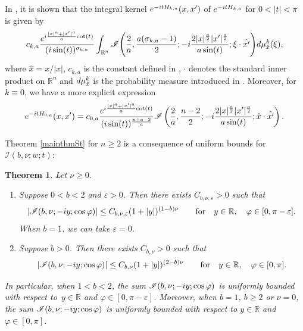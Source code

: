 \documentclass[10pt,a4paper]{article}
\numberwithin{equation}{section}
\newtheorem{Theorem}{Theorem}[section]
\def\R{\mathbb{R}}%
\def\e{\varepsilon}
\def\f{\varphi}
\def\m{\mu}
\def\n{\nu}
\def\x{\xi}
\newcommand{\sI}{\mathscr{I}}
\begin{document}
In \cite[Theorem C, equations (4.50) and (4.52)]{BKO}, it is shown that the integral kernel ${\rm e}^{-{\rm i}tH_{k,a}}(x,\allowbreak x')$ of ${\rm e}^{-{\rm i}tH_{k,a}}$ for $0<|t|<\pi$ is given by
\begin{align}\label{intkergen}
c_{k,a}\frac{{\rm e}^{{\rm i}\frac{|x|^a+|x'|^a}{a}\mathrm{cot}(t)} }{({\rm i}\sin (t))^{\sigma_{k,a}}} \int_{\R^n}\sI\Bigg(\frac{2}{a},\frac{a(\sigma_{k,a}-1)}{2}; -{\rm i}\frac{2|x|^{\frac{a}{2}}|x'|^{\frac{a}{2}} }{a\sin(t)}; \x\cdot \hat{x'}\Bigg){\rm d}\m_{\hat{x}}^k(\x),
\end{align}
where $\hat{x}=x/|x|$, $c_{k,a}$ is the constant defined in \cite[equation~(1.6)]{BKO}, $\cdot $ denotes the standard inner product on $\R^n$ and ${\rm d}\m_{\hat{x}}^{k}$ is the probability measure introduced in \cite[equation~(2.5)]{BKO}. Moreover, for $k\equiv 0$, we have a more explicit expression
\begin{align}\label{intker0}
{\rm e}^{-{\rm i}tH_{0,a}}(x,x')=c_{0,a}\frac{{\rm e}^{{\rm i}\frac{|x|^a+|x'|^a}{a}\mathrm{cot}(t)} }{({\rm i}\sin (t))^{\frac{n+a-2}{a}}} \sI\left(\frac{2}{a},\frac{n-2}{2}; -{\rm i}\frac{2|x|^{\frac{a}{2}}|x'|^{\frac{a}{2}} }{a\sin(t)}; \hat{x}\cdot \hat{x'}\right).
\end{align}

Theorem \ref{mainthmSt} for $n\geq 2$ is a consequence of uniform bounds for $\sI(b,\nu;w;t)$:

\begin{Theorem}\label{keythm}
Let $\n\geq 0$.
\begin{enumerate}\itemsep=0pt
\item[$(i)$]
Suppose $0<b<2$ and $\e>0$. Then there exists $C_{b,\n,\e}>0$ such that
\begin{align*}
|\sI(b,\nu;-{\rm i}y;\cos\f)|\leq C_{b,\n,\e}(1+|y|)^{(1-b)\n}\qquad \text{for}\quad y\in \R,\quad \f\in [0,\pi-\e].
\end{align*}
When $b=1$, we can take $\e=0$.

\item[$(ii)$]
Suppose $b>0$. Then there exists $C_{b,\n}>0$ such that
\begin{align*}
|\sI(b,\nu;-{\rm i}y;\cos\f)|\leq C_{b,\n}(1+|y|)^{(2-b)\n}\qquad \text{for}\quad y\in \R,\quad \f\in [0,\pi].
\end{align*}
\end{enumerate}
In particular, when $1< b< 2$, the sum $\sI(b,\nu;-{\rm i}y;\cos\f)$ is uniformly bounded with respect to~${y\in \R}$ and $\f\in [0,\pi-\e]$. Moreover, when $b=1$, $b\geq 2$ or $\nu=0$, the sum $\sI(b,\nu;-{\rm i}y;\cos\f)$ is uniformly bounded with respect to $y\in \R$ and $\f\in [0,\pi]$.
\end{Theorem}
\end{document}
